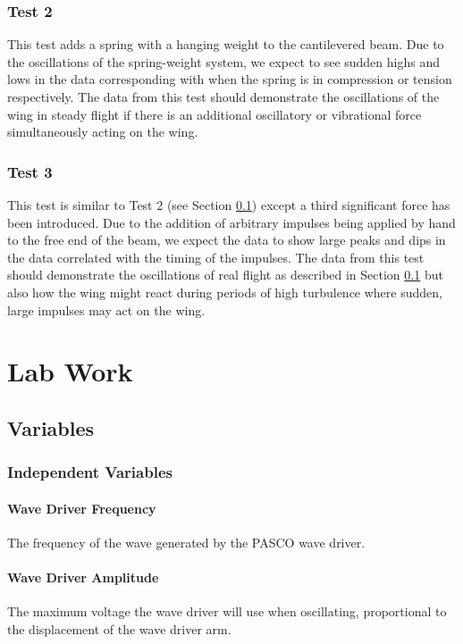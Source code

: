 \documentclass[12 pt]{report}
\begin{document}
\subsection{Test 2} \label{hypothesis-test_2}
This test adds a spring with a hanging weight to the cantilevered beam. Due to the oscillations of the spring-weight system, we expect to see sudden highs and lows in the data corresponding with when the spring is in compression or tension respectively. The data from this test should demonstrate the oscillations of the wing in steady flight if there is an additional oscillatory or vibrational force simultaneously acting on the wing.

\subsection{Test 3} \label{hypothesis-test_3}
This test is similar to Test \num{2} (see Section \ref{hypothesis-test_2}) except a third significant force has been introduced. Due to the addition of arbitrary impulses being applied by hand to the free end of the beam, we expect the data to show large peaks and dips in the data correlated with the timing of the impulses. The data from this test should demonstrate the oscillations of real flight as described in Section \ref{hypothesis-test_2} but also how the wing might react during periods of high turbulence where sudden, large impulses may act on the wing.

\chapter{Lab Work} \label{lab_work}
\section{Variables} \label{variables}
\subsection{Independent Variables} \label{variables-independent_variables}
\subsubsection{Wave Driver Frequency} \label{variables-independent_variables-wave_drive_frequency}
The frequency of the wave generated by the PASCO wave driver.

\subsubsection{Wave Driver Amplitude} \label{variables-independent_variables-wave_driver_amplitude}
The maximum voltage the wave driver will use when oscillating, proportional to the displacement of the wave driver arm.
\end{document}
